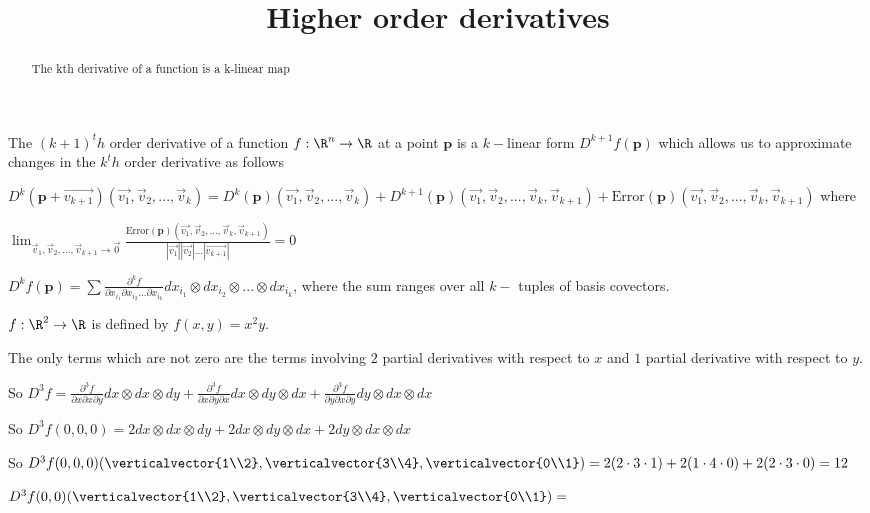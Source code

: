 \documentclass{ximera}
\title{Higher order derivatives}
\begin{document}
\begin{abstract}
	The kth derivative of a function is a k-linear map
\end{abstract}

The $(k+1)^th$ order derivative of a function $f: \R^n \to \R$  at a point $\mathbf{p}$ is a $k-$linear form  $D^{k+1} f(\mathbf{p})$ 
which allows us to approximate changes in the $k^th$ order derivative as follows
	
\begin{definition}
	$D^k(\mathbf{p} + \vec{v_{k+1}})(\vec{v_1},\vec{v}_2,...,\vec{v}_k)  = 
	D^k(\mathbf{p})(\vec{v_1},\vec{v}_2,...,\vec{v}_k) + D^{k+1}(\mathbf{p})(\vec{v_1},\vec{v}_2,...,\vec{v}_k,\vec{v}_{k+1})+ 
	\textrm{Error}(\mathbf{p})(\vec{v_1},\vec{v}_2,...,\vec{v}_k,\vec{v}_{k+1})$ where 
	
	\(
		\displaystyle\lim_{\vec{v}_1,\vec{v}_2,...,\vec{v}_{k+1} \to \vec{0} } 
		\frac{\textrm{Error}(\mathbf{p})(\vec{v_1},\vec{v}_2,...,\vec{v}_k,\vec{v}_{k+1})}{|\vec{v_1}||\vec{v_2}|...|\vec{v_{k+1}}|} = 0
	\)
\end{definition}

\begin{theorem}
	$D^kf(\mathbf{p}) = \sum \frac{\partial^kf}{\partial x_{i_1} \partial x_{i_2}... \partial x_{i_k}} dx_{i_1} \otimes dx_{i_2} \otimes ... \otimes dx_{i_k}$, where the sum ranges 
	over all $k-$ tuples of basis covectors.
\end{theorem}

\begin{question}
	$f:\R^2 \to \R$ is defined by $f(x,y) = x^2y$.  
	\begin{solution}
	\begin{hint}
		The only terms which are not zero are the terms involving $2$ partial derivatives with respect to $x$ and $1$ partial derivative with respect to $y$.
	\end{hint}
	\begin{hint}
		So $D^3f = \frac{\partial ^3 f}{\partial x \partial x \partial y} dx \otimes dx \otimes dy+ \frac{\partial ^3 f}{\partial x \partial y \partial x} dx \otimes dy \otimes dx+ \frac{\partial ^3 f}{\partial y \partial x \partial y} dy \otimes dx \otimes dx$
	\end{hint}
	\begin{hint}
		So $D^3f(0,0,0) = 2 dx\otimes dx \otimes dy+ 2 dx\otimes dy \otimes dx+2 dy\otimes dx \otimes dx$
	\end{hint}
	\begin{hint}
		So $D^3f(0,0,0)(\verticalvector{1\\2},\verticalvector{3\\4},\verticalvector{0\\1}) =2( 2 \cdot 3 \cdot 1)+2( 1 \cdot 4 \cdot 0)+2(2 \cdot 3 \cdot 0) = 12$
	\end{hint}
	$D^3f(0,0)(\verticalvector{1\\2},\verticalvector{3\\4},\verticalvector{0\\1})=$
	\end{solution}
\end{question}
\end{document}
